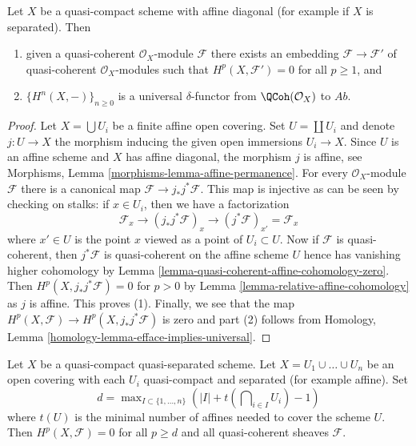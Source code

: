 \begin{lemma}
\label{lemma-affine-diagonal-universal-delta-functor}
Let $X$ be a quasi-compact scheme with affine diagonal
(for example if $X$ is separated). Then
\begin{enumerate}
\item given a quasi-coherent $\mathcal{O}_X$-module $\mathcal{F}$
there exists an embedding $\mathcal{F} \to \mathcal{F}'$ of
quasi-coherent $\mathcal{O}_X$-modules
such that $H^p(X, \mathcal{F}') = 0$ for all $p \geq 1$, and
\item $\{H^n(X, -)\}_{n \geq 0}$
is a universal $\delta$-functor from $\QCoh(\mathcal{O}_X)$ to
$\textit{Ab}$.
\end{enumerate}
\end{lemma}

\begin{proof}
Let $X = \bigcup U_i$ be a finite affine open covering.
Set $U = \coprod U_i$ and denote $j : U \to X$
the morphism inducing the given open immersions $U_i \to X$.
Since $U$ is an affine scheme and $X$ has affine diagonal,
the morphism $j$ is affine, see
Morphisms, Lemma \ref{morphisms-lemma-affine-permanence}.
For every $\mathcal{O}_X$-module $\mathcal{F}$ there is
a canonical map $\mathcal{F} \to j_*j^*\mathcal{F}$.
This map is injective as can be seen by checking on stalks:
if $x \in U_i$, then we have a factorization
$$
\mathcal{F}_x \to (j_*j^*\mathcal{F})_x
\to (j^*\mathcal{F})_{x'} = \mathcal{F}_x
$$
where $x' \in U$ is the point $x$ viewed as a point of $U_i \subset U$.
Now if $\mathcal{F}$ is quasi-coherent, then $j^*\mathcal{F}$
is quasi-coherent on the affine scheme $U$ hence has vanishing
higher cohomology by
Lemma \ref{lemma-quasi-coherent-affine-cohomology-zero}.
Then $H^p(X, j_*j^*\mathcal{F}) = 0$ for
$p > 0$ by Lemma \ref{lemma-relative-affine-cohomology}
as $j$ is affine. This proves (1).
Finally, we see that the map
$H^p(X, \mathcal{F}) \to H^p(X, j_*j^*\mathcal{F})$
is zero and part (2) follows from
Homology, Lemma \ref{homology-lemma-efface-implies-universal}.
\end{proof}

\begin{lemma}
\label{lemma-vanishing-nr-affines-quasi-separated}
Let $X$ be a quasi-compact quasi-separated scheme.
Let $X = U_1 \cup \ldots \cup U_n$ be an open covering
with each $U_i$ quasi-compact and separated (for example affine).
Set
$$
d = \max\nolimits_{I \subset \{1, \ldots, n\}}
\left(|I| + t(\bigcap\nolimits_{i \in I} U_i) - 1\right)
$$
where $t(U)$ is the minimal number of affines needed to cover
the scheme $U$. Then $H^p(X, \mathcal{F}) = 0$ for all $p \geq d$ and all
quasi-coherent sheaves $\mathcal{F}$.
\end{lemma}

